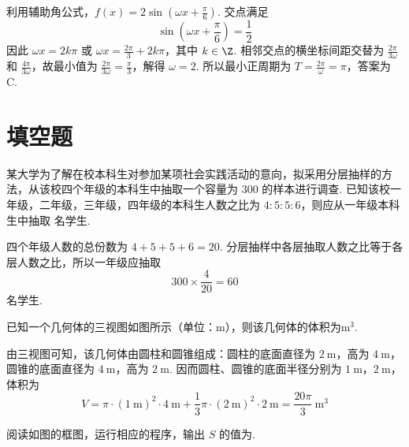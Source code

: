 
\begin{solution}
利用辅助角公式，\(f(x)=2\sin\left(\omega x+\frac\pi6\right)\). 交点满足
\[
\sin\left(\omega x+\frac\pi6\right)=\frac12
\]
因此 \(\omega x=2k\pi\) 或 \(\omega x=\frac{2\pi}{3}+2k\pi\)，其中 \(k\in\Z\). 相邻交点的横坐标间距交替为 \(\frac{2\pi}{3\omega}\) 和 \(\frac{4\pi}{3\omega}\)，故最小值为 \(\frac{2\pi}{3\omega}=\frac\pi3\)，解得 \(\omega=2\). 所以最小正周期为 \(T=\frac{2\pi}{\omega}=\pi\)，答案为 C.
\end{solution}

\section{填空题}

\begin{problem}
某大学为了解在校本科生对参加某项社会实践活动的意向，拟采用分层抽样的方法，从该校四个年级的本科生中抽取一个容量为 \(300\) 的样本进行调查. 已知该校一年级，二年级，三年级，四年级的本科生人数之比为 \(4:5:5:6\)，则应从一年级本科生中抽取\fillinblank{} 名学生.
\end{problem}


\begin{solution}
四个年级人数的总份数为 \(4+5+5+6=20\). 分层抽样中各层抽取人数之比等于各层人数之比，所以一年级应抽取
\[
300\times\frac4{20}=60
\]
名学生.
\end{solution}

\begin{problem}
已知一个几何体的三视图如图所示（单位：\(\mathrm{m}\)），则该几何体的体积为\fillinblank{}\(\mathrm{m}^{3}\).

\end{problem}


\begin{solution}
由三视图可知，该几何体由圆柱和圆锥组成：圆柱的底面直径为 \(2 \mathrm{~m}\)，高为 \(4 \mathrm{~m}\)，圆锥的底面直径为 \(4 \mathrm{~m}\)，高为 \(2 \mathrm{~m}\). 因而圆柱、圆锥的底面半径分别为 \(1 \mathrm{~m}\)，\(2 \mathrm{~m}\)，体积为
\[
V=\pi\cdot(1 \mathrm{~m})^2\cdot4 \mathrm{~m}+\frac13\pi\cdot(2 \mathrm{~m})^2\cdot2 \mathrm{~m}=\frac{20\pi}{3}\ \mathrm{m}^{3}
\]
\end{solution}

\begin{problem}
阅读如图的框图，运行相应的程序，输出 \(S\) 的值为\fillinblank{}.

\end{problem}

